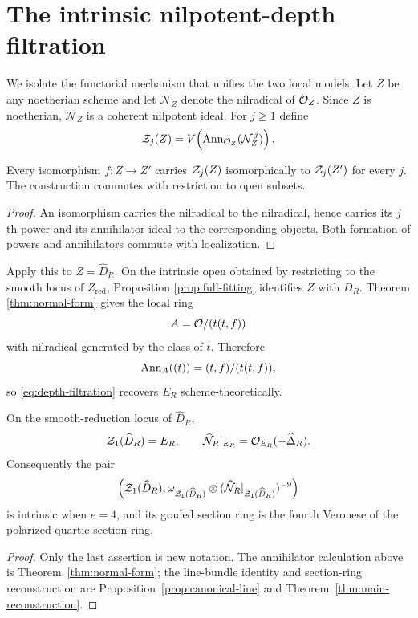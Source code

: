 \section{The intrinsic nilpotent-depth filtration}
\label{sec:depth}

We isolate the functorial mechanism that unifies the two local models.
Let $Z$ be any noetherian scheme and let $\mathcal N_Z$ denote the
nilradical of $\mathcal O_Z$.  Since $Z$ is noetherian, $\mathcal N_Z$ is a
coherent nilpotent ideal.  For $j\ge1$ define
\begin{equation}\label{eq:depth-filtration}
 \mathcal Z_j(Z)=
 V\!\left(\operatorname{Ann}_{\mathcal O_Z}(\mathcal N_Z^{\,j})\right).
\end{equation}

\begin{lemma}[Functoriality]\label{lem:depth-functorial}
Every isomorphism $f:Z\to Z'$ carries
$\mathcal Z_j(Z)$ isomorphically to $\mathcal Z_j(Z')$ for every $j$.
The construction commutes with restriction to open subsets.
\end{lemma}
\begin{proof}
An isomorphism carries the nilradical to the nilradical, hence carries
its $j$th power and its annihilator ideal to the corresponding objects.
Both formation of powers and annihilators commute with localization.
\end{proof}

Apply this to $Z=\widehat D_R$.  On the intrinsic open obtained by
restricting to the smooth locus of $Z_{\mathrm{red}}$, Proposition
\ref{prop:full-fitting} identifies $Z$ with $D_R$.  Theorem
\ref{thm:normal-form} gives the local ring
\[
 A=\mathcal O/(t(t,f))
\]
with nilradical generated by the class of $t$.  Therefore
\[
 \operatorname{Ann}_A((t))=(t,f)/(t(t,f)),
\]
so \eqref{eq:depth-filtration} recovers $E_R$ scheme-theoretically.

\begin{proposition}
\label{prop:depth-one}
On the smooth-reduction locus of $\widehat D_R$,
\[
 \mathcal Z_1(\widehat D_R)=E_R,\qquad
 \widehat{\mathcal N}_R|_{E_R}=\mathcal O_{E_R}(-\widehat\Delta_R).
\]
Consequently the pair
\[
 \left(\mathcal Z_1(\widehat D_R),
 \omega_{\mathcal Z_1(\widehat D_R)}
 \otimes
 (\widehat{\mathcal N}_R|_{\mathcal Z_1(\widehat D_R)})^{-9}\right)
\]
is intrinsic when $e=4$, and its graded section ring is the fourth
Veronese of the polarized quartic section ring.
\end{proposition}
\begin{proof}
Only the last assertion is new notation.  The annihilator calculation
above is Theorem~\ref{thm:normal-form}; the line-bundle identity and
section-ring reconstruction are Proposition~\ref{prop:canonical-line}
and Theorem~\ref{thm:main-reconstruction}.
\end{proof}

